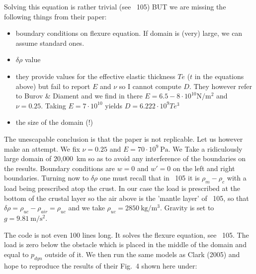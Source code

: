 Solving this equation is rather trivial (see \stone~105) BUT we are missing the following things from their paper:
\begin{itemize}
\item boundary conditions on flexure equation. If domain is (very) large, we can assume standard ones. 
\item $\delta \rho$ value
\item they provide values for the effective elastic thickness $T\!e$ ($t$ in the equations above) but fail to report $E$ and $\nu$ so I cannot compute $D$. They however refer to Burov \& Diament \cite{budi95} and we find in there $E=6.5-8\cdot 10^{10}\si{\newton\per\square\meter}$ and $\nu=0.25$.
Taking $E=7\cdot 10^{10}$ yields $D = 6.222\cdot 10^9 T\!e^3$ 
\item the size of the domain (!)
\end{itemize}
The unescapable conclusion is that the paper is not replicable. Let us however make an attempt. 
We fix $\nu=0.25$ and $E=70\cdot10^{9}~\si{\pascal}$. We Take a ridiculously large domain
of 20,000~\si{\km} so as to avoid any interference of the boundaries on the results. 
Boundary conditions are $w=0$ and $w'=0$ on the left and right boundaries. 
Turning now to $\delta \rho$ one must recall that in \stone~105 it is $\rho_m-\rho_c$ with a load being prescribed atop the crust.
In our case the load is prescribed at the bottom of the crustal layer so the air above is the 'mantle layer' of \stone~105, so that 
$\delta\rho=\rho_{uc}-\rho_{air}=\rho_{uc}$ and we take $\rho_{uc}=2850~\si{\kg\per\cubic\meter}$. 
Gravity is set to $g=9.81~\si{\metre\per\square\second}$.

The code is not even 100 lines long. It solves the flexure equation, see \stone~105. The load is zero below the 
obstacle which is placed in the middle of the domain and equal to $p_{dyn}$ outside of it. 
We then run the same models as Clark \etal (2005)
and hope to reproduce the results of their Fig.~4 shown here under:

